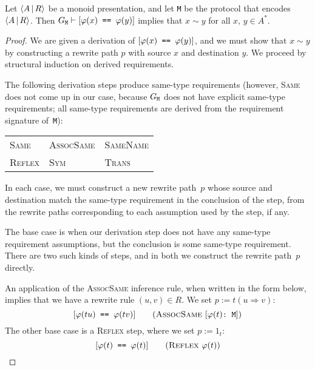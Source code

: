 \documentclass[../generics]{subfiles}
\begin{document}
\begin{theorem}\label{derivation to path}
Let $\langle A\,|\,R\rangle$ be a monoid presentation, and let \texttt{M} be the protocol that encodes $\langle A\,|\,R\rangle$. Then $G_\texttt{M}\vdash[\texttt{$\varphi(x)$ == $\varphi(y)$}]$ implies that $x\sim y$ for all $x$, $y\in A^*$.
\end{theorem}
\begin{proof}
We are given a derivation of $[\texttt{$\varphi(x)$ == $\varphi(y)$}]$, and we must show that $x\sim y$ by constructing a rewrite path $p$ with source $x$ and destination $y$. We proceed by structural induction on derived requirements.

The following derivation steps produce same-type requirements (however, \textsc{Same} does not come up in our case, because $G_\texttt{M}$ does not have explicit same-type requirements; all same-type requirements are derived from the requirement signature of~\texttt{M}):
\begin{center}
\begin{tabular}{lll}
\toprule
\textsc{Same}&\textsc{AssocSame}&\textsc{SameName}\\
\textsc{Reflex}&\textsc{Sym}&\textsc{Trans}\\
\bottomrule
\end{tabular}
\end{center}
In each case, we must construct a new rewrite path~$p$ whose source and destination match the same-type requirement in the conclusion of the step, from the rewrite paths corresponding to each assumption used by the step, if any.

\BaseCase The base case is when our derivation step does not have any same-type requirement assumptions, but the conclusion is some same-type requirement. There are two such kinds of steps, and in both we construct the rewrite path~$p$ directly.

An application of the \textsc{AssocSame} inference rule, when written in the form below, implies that we have a rewrite rule $(u,v)\in R$. We set $p:=t(u\Rightarrow v)$:
\[\SameReqPhi{tu}{tv}\tag{\textsc{AssocSame} $\ConfReqPhi{t}$}\]
The other base case is a \textsc{Reflex} step, where we set $p:=1_t$:
\[\SameReqPhi{t}{t}\tag{\textsc{Reflex} $\varphi(t)$}\]


\end{proof}
\end{document}
